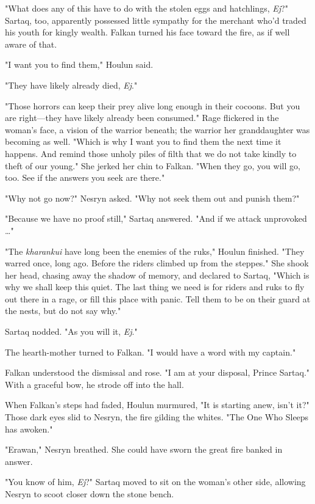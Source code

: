 "What does any of this have to do with the stolen eggs and hatchlings,
\emph{Ej}?" Sartaq, too, apparently possessed little sympathy for the merchant who'd traded his youth for kingly wealth. Falkan turned his face toward the fire, as if well aware of that.

"I want you to find them," Houlun said.

"They have likely already died, \emph{Ej}."

"Those horrors can keep their prey alive long enough in their cocoons. But you are right---they have likely already been consumed." Rage flickered in the woman's face, a vision of the warrior beneath; the warrior her granddaughter was becoming as well. "Which is why I want you to find them the next time it happens. And remind those unholy piles of filth that we do not take kindly to theft of our young." She jerked her chin to Falkan. "When they go, you will go, too. See if the answers you seek are there."

"Why not go now?" Nesryn asked. "Why not seek them out and punish them?"

"Because we have no proof still," Sartaq answered. "And if we attack unprovoked \ldots"

"The \emph{kharankui} have long been the enemies of the ruks," Houlun finished. "They warred once, long ago. Before the riders climbed up from the steppes." She shook her head, chasing away the shadow of memory, and declared to Sartaq, "Which is why we shall keep this quiet. The last thing we need is for riders and ruks to fly out there in a rage, or fill this place with panic. Tell them to be on their guard at the nests, but do not say why."

Sartaq nodded. "As you will it, \emph{Ej}."

The hearth-mother turned to Falkan. "I would have a word with my captain."

Falkan understood the dismissal and rose. "I am at your disposal, Prince Sartaq." With a graceful bow, he strode off into the hall.

When Falkan's steps had faded, Houlun murmured, "It is starting anew, isn't it?" Those dark eyes slid to Nesryn, the fire gilding the whites. "The One Who Sleeps has awoken."

"Erawan," Nesryn breathed. She could have sworn the great fire banked in answer.

"You know of him, \emph{Ej}?" Sartaq moved to sit on the woman's other side, allowing Nesryn to scoot closer down the stone bench.

